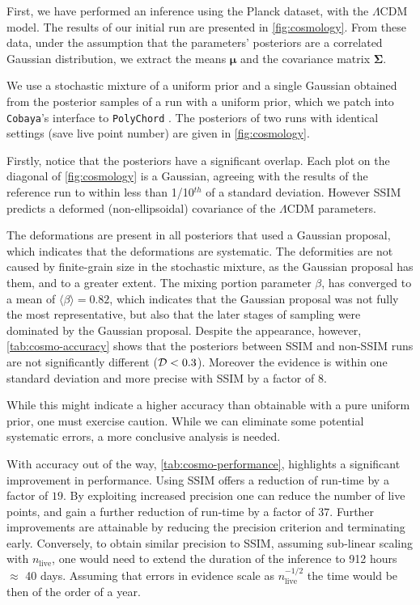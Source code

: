 \documentclass[draft,usenatbib]{mnras}
\begin{document}
First, we have performed an inference using the Planck \citep{Planck} dataset,
with the \(\Lambda\)CDM model. The results of our initial run are
presented in \cref{fig:cosmology}. From these data, under the
assumption that the parameters' posteriors are a correlated Gaussian
distribution, we extract the means \(\bm{\mu}\) and the covariance
matrix \(\bm{\Sigma}\).

We use a stochastic mixture of a uniform prior and a single Gaussian
obtained from the posterior samples of a run with a uniform prior,
which we patch into \texttt{Cobaya}'s interface to \texttt{PolyChord}
\citep{code}. The posteriors of two runs with identical settings (save
live point number) are given in \cref{fig:cosmology}.

Firstly, notice that the posteriors have a significant overlap. Each
plot on the diagonal of \cref{fig:cosmology} is a Gaussian, agreeing
with the results of the reference run to within less than 1/10\(^{th}\) of a
standard deviation. However SSIM predicts a deformed (non-ellipsoidal)
covariance of the \(\Lambda\)CDM parameters. 

The deformations are present in all posteriors that used a Gaussian
proposal, which indicates that the deformations are systematic. The
deformities are not caused by finite-grain size in the stochastic
mixture, as the Gaussian proposal has them, and to a greater
extent. The mixing portion parameter \(\beta\), has converged to a mean
of \(\langle \beta \rangle = 0.82\), which indicates that the Gaussian
proposal was not fully the most representative, but also that the
later stages of sampling were dominated by the Gaussian
proposal. Despite the appearance, however, \cref{tab:cosmo-accuracy}
shows that the posteriors between SSIM and non-SSIM runs are not
significantly different (\({\cal D}< 0.3\)). Moreover the evidence is
within one standard deviation and more precise with SSIM by a factor
of \(8\).

While this might indicate a higher accuracy than obtainable with a
pure uniform prior, one must exercise caution. While we can eliminate
some potential systematic errors, a more conclusive analysis is
needed.

With accuracy out of the way, \cref{tab:cosmo-performance}, highlights
a significant improvement in performance. Using SSIM offers a
reduction of run-time by a factor of \(19\). By exploiting increased
precision one can reduce the number of live points, and gain a further
reduction of run-time by a factor of \(37\). Further improvements are
attainable by reducing the precision criterion and terminating
early. Conversely, to obtain similar precision to SSIM, assuming
sub-linear scaling with \(n_\text{live}\), one would need to extend
the duration of the inference to 912 hours \(\approx\) 40
days. Assuming that errors in evidence scale as
\(n_\text{live}^{-1/2}\) the time would be then of the order of a
year.
\end{document}
